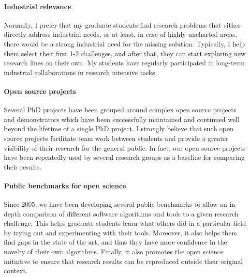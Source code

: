 \paragraph{Industrial relevance}
Normally, I prefer that my graduate students find research problems that either directly address industrial needs, or at least, in case of highly uncharted areas, there would be a strong industrial need for the missing solution. Typically, I help them select their first 1-2 challenges, and after that, they can start exploring new research lines on their own. 
My students have regularly participated in long-term industrial collaborations in research intensive tasks. 

\paragraph{Open source projects}
Several PhD projects have been grouped around complex open source projects and demonstrators which have been successfully maintained and continued well beyond the lifetime of a single PhD project. I strongly believe that such open source projects facilitate team work between students and provide a greater visibility of their research for the general public. In fact, our open source projects have been repeatedly used by several research groups as a baseline for comparing their results. 

\paragraph{Public benchmarks for open science}
Since 2005, we have been developing several public benchmarks to allow an in-depth comparison of different software algorithms and tools to a given research challenge. This helps graduate students learn what others did in a particular field by trying out and experimenting with their tools. Moreover, it also helps them find gaps in the state of the art, and thus they have more confidence in the novelty of their own algorithms. Finally, it also promotes the open science initiative to ensure that research results can be reproduced outside their original context.








